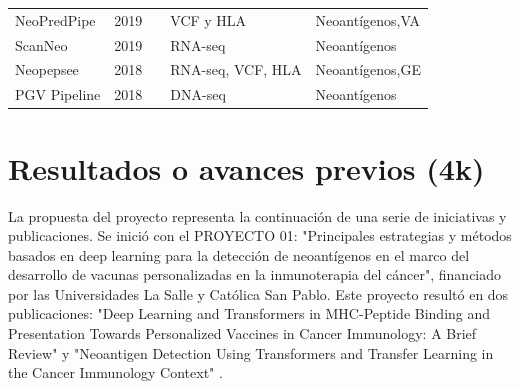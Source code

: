 \documentclass[a4paper,11pt]{article}
\begin{document}
\begin{table}[h]
{{\begin{tabular}{lllp{4.5cm}p{2.7cm}}
	NeoPredPipe     & 2019 &\cite{schenck2019neopredpipe}     & VCF y HLA                            & Neoantígenos,VA              \\
	
	ScanNeo         & 2019 &\cite{wang2019scanneo}            & RNA-seq                                                  & Neoantígenos                                       \\
	
		
	Neopepsee       & 2018 &\cite{kim2018neopepsee}           & RNA-seq, VCF, HLA  & Neoantígenos,GE    \\ 
	
	PGV Pipeline    & 2018 &\cite{rubinsteyn2018computational}& DNA-seq                                                  & Neoantígenos                                       \\
	

\end{tabular}
}	
}
\end{table}






\section{Resultados o avances previos (4k)}


La propuesta del proyecto representa la continuación de una serie de iniciativas y publicaciones. Se inició con el PROYECTO 01: "Principales estrategias y métodos basados en deep learning para la detección de neoantígenos en el marco del desarrollo de vacunas personalizadas en la inmunoterapia del cáncer", financiado por las Universidades La Salle y Católica San Pablo. Este proyecto resultó en dos publicaciones: "Deep Learning and Transformers in MHC-Peptide Binding and Presentation Towards Personalized Vaccines in Cancer Immunology: A Brief Review" \cite{machaca2023deep} y "Neoantigen Detection Using Transformers and Transfer Learning in the Cancer Immunology Context" \cite{arceda2023neoantigen}.
\end{document}
